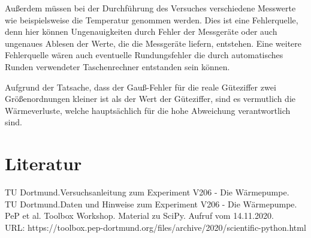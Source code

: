 \documentclass[titlepage=firstcover, captions=tableheading]{scrartcl}
\begin{document}
\noindent Außerdem müssen bei der Durchführung des Versuches verschiedene Messwerte wie beispielsweise die Temperatur genommen werden.
Dies ist eine Fehlerquelle, denn hier können Ungenauigkeiten durch Fehler der Messgeräte oder auch ungenaues Ablesen der Werte, die die Messgeräte liefern, entstehen.
Eine weitere Fehlerquelle wären auch eventuelle Rundungsfehler die durch automatisches Runden verwendeter Taschenrechner entstanden sein können.

\noindent Aufgrund der Tatsache, dass der Gauß-Fehler für die reale Güteziffer zwei Größenordnungen kleiner ist als der Wert der Güteziffer,
sind es vermutlich die Wärmeverluste, welche hauptsächlich für die hohe Abweichung verantwortlich sind. 

\section{Literatur}
TU Dortmund.Versuchsanleitung zum Experiment V206 - Die Wärmepumpe.\\
TU Dortmund.Daten und Hinweise zum Experiment V206 - Die Wärmepumpe.\\
PeP et al. Toolbox Workshop. Material zu SciPy. Aufruf vom 14.11.2020.\\
URL: https://toolbox.pep-dortmund.org/files/archive/2020/scientific-python.html
\end{document}
